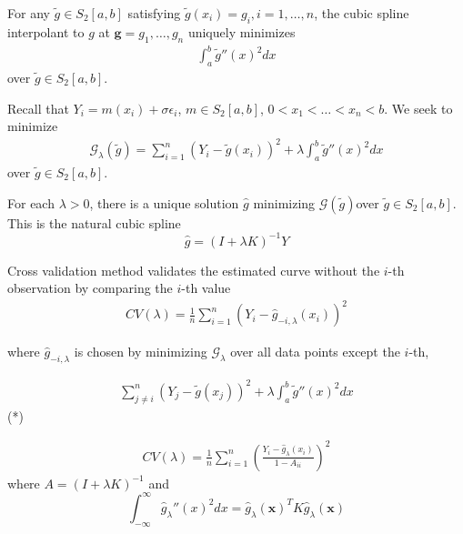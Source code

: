 \begin{thm}
  \label{defn:nonparametric_regression:3}
  For any $\tilde g \in S_{2}[a, b]$ satisfying $\tilde g(x_{i})=
  g_{i}, i=1, \dots, n$, the cubic spline interpolant to $g$ at
  $\mathbf{g} = g_{1}, \dots, g_{n}$ uniquely minimizes
  \begin{align}
    \label{eq:66}
    \int_{a}^{b} \tilde g''(x)^{2} dx
  \end{align} over $\tilde g \in S_{2}[a, b]$.
\end{thm}

Recall that $Y_{i} = m(x_{i}) + \sigma \epsilon_{i}$, $m \in
S_{2}[a,b]$, $0 < x_{1} < \dots < x_{n} < b$.  We seek to minimize
\begin{align}
  \label{eq:70}
  \mathcal{G}_{\lambda}(\tilde g) = \sum_{i=1}^{n} (Y_{i} - \tilde
  g(x_{i}))^{2} + \lambda \int_{a}^{b}  \tilde g''(x)^{2} dx 
\end{align} over $\tilde g \in S_{2}[a, b]$.

\begin{thm}
  \label{defn:nonparametric_regression:4}
  For each $\lambda > 0$, there is a unique solution $\hat g$ minimizing
  $\mathcal{G}(\tilde g)$over $\tilde g \in S_{2}[a, b]$.  This is the
  natural cubic spline
  \begin{equation}
    \label{eq:71}
    \hat g = (I + \lambda K)^{-1} Y
  \end{equation}  
\end{thm}

Cross validation method validates the estimated curve without the
$i$-th observation by comparing the $i$-th value
\begin{align}
  \label{eq:74}
  CV(\lambda) = \frac{1}{n} \sum_{i=1}^{n} (Y_{i} - \hat g_{-i, \lambda}(x_{i}))^{2}
\end{align}

where $\hat g_{-i, \lambda}$ is chosen by minimizing
$\mathcal{G}_{\lambda}$ over all data points except the $i$-th,

\begin{align}
  \label{eq:76}
  \sum_{j \neq i}^{n} (Y_{j} - \tilde g(x_{j}))^{2} + \lambda
  \int_{a}^{b} \tilde g''(x)^{2} dx
\end{align} (*)

\begin{thm}
  \label{defn:nonparametric_regression:5}
  \begin{align}
    \label{eq:75}
    CV(\lambda) = \frac{1}{n} \sum_{i=1}^{n} (\frac{Y_{i} - \hat
      g_{\lambda}(x_{i})}{1 - A_{ii}})^{2}
  \end{align}
  where $A = (I + \lambda K)^{-1}$ and
  \begin{equation}
    \label{eq:80}
    \int_{-\infty}^{\infty}  \hat g_{\lambda}''(x)^{2} dx = \hat
    g_{\lambda}(\mathbf{x})^{T} K \hat g_{\lambda}(\mathbf{x})
  \end{equation}
\end{thm}

